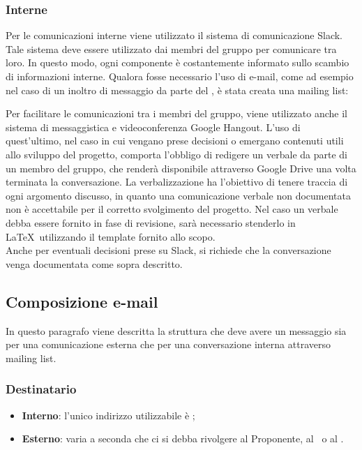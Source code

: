 \documentclass[../NormeDiProgetto.tex]{subfiles}
\begin{document}
			\subsubsection{Interne}
				Per le comunicazioni interne viene utilizzato il sistema di
				comunicazione Slack.\\
				Tale sistema deve essere utilizzato dai membri del gruppo
				per comunicare tra loro.
				In questo modo, ogni componente è costantemente informato sullo
				scambio di informazioni interne.
				Qualora fosse necessario l'uso di e-mail, come ad esempio nel caso di
				un inoltro di messaggio da parte del \responsabilediprogetto,
				è stata creata una mailing list:
				\begin{center}
					\mailinglist
				\end{center}
				Per facilitare le comunicazioni tra i membri del gruppo, viene
				utilizzato anche il sistema di messaggistica e videoconferenza
				Google Hangout.
				L'uso di quest'ultimo, nel caso in cui
				vengano prese decisioni	o emergano contenuti utili allo
				sviluppo del progetto, comporta l'obbligo di redigere un verbale
				da parte di un membro del gruppo, che renderà disponibile attraverso
				Google Drive una volta terminata la conversazione.
				La verbalizzazione ha l'obiettivo di tenere
				traccia di ogni argomento discusso, in
				quanto una comunicazione verbale non documentata non è
				accettabile per il corretto svolgimento del progetto. Nel caso un verbale
				debba essere fornito in fase di revisione, sarà necessario stenderlo in \LaTeX\
				utilizzando il template fornito allo scopo.\\
				Anche per eventuali decisioni prese su Slack, si richiede che la conversazione
				venga documentata come sopra descritto.
			\subsection{Composizione e-mail}
				In questo paragrafo viene descritta la struttura che deve avere
				un messaggio sia per una comunicazione esterna che per una
				conversazione interna attraverso mailing list.
				\subsubsection{Destinatario}
					\begin{itemize}
						\item \textbf{Interno}: l'unico indirizzo utilizzabile è
						\mailkaleidoscode;
						\item \textbf{Esterno}: varia a seconda che ci si debba
						rivolgere  al Proponente, al \vardanega\ o al \cardin.
					\end{itemize}
\end{document}
